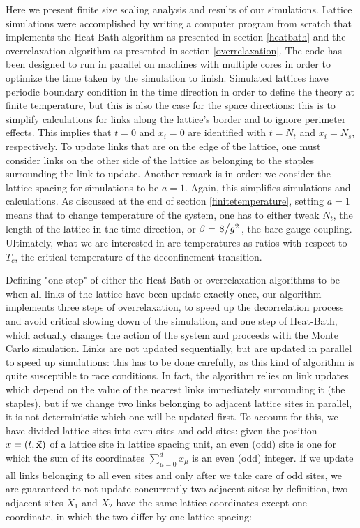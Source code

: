 \documentclass[reqno,12pt]{article}
\numberwithin{equation}{section}
\begin{document}
Here we present finite size scaling analysis and results of our simulations. Lattice simulations were accomplished
by writing a computer program from scratch that implements the Heat-Bath algorithm as presented in section
\ref{heatbath} and the overrelaxation algorithm as presented in section \ref{overrelaxation}. 
The code has been designed to run in parallel on machines with multiple cores in order to
optimize the time taken by the simulation to finish. Simulated lattices have periodic boundary condition in the time
direction in order to define the theory at finite temperature, but this is also the case for the space directions:
this is to simplify calculations for links along the lattice's border and to ignore perimeter effects. This implies
that $t = 0$ and $x_i = 0$ are identified with $t = N_t$ and $x_i = N_s$, respectively.
To update links that are on the edge of the lattice, one must consider links on the other side of the lattice as 
belonging to the staples surrounding the link to update. Another remark is in order: we consider the lattice spacing
for simulations to be $a = 1$. Again, this simplifies simulations and calculations. As discussed at the end of
section \ref{finitetemperature}, setting $a = 1$ means that to change temperature of the system, one has to either
tweak $N_t$, the length of the lattice in the time direction, or $\beta = \flatfrac{8}{g^2}$, the bare gauge
coupling. Ultimately, what we are interested in are temperatures as ratios with respect to $T_c$, the critical 
temperature of the deconfinement transition.

Defining "one step" of either the Heat-Bath or overrelaxation algorithms to be when all links of the lattice
have been update exactly once, our algorithm implements three steps of overrelaxation, to speed up the
decorrelation process and avoid critical slowing down of the simulation, and one step of Heat-Bath, which 
actually changes the action of the system and proceeds with the Monte Carlo simulation. Links are not updated
sequentially, but are updated in parallel to speed up simulations: this has to be done carefully, as this kind
of algorithm is quite susceptible to race conditions. In fact, the algorithm relies on link updates which
depend on the value of the nearest links immediately surrounding it (the staples), but if we change two links
belonging to adjacent lattice sites in parallel, it is not deterministic which one will be updated first. To 
account for this, we have divided lattice sites into even sites and odd sites: given the position 
$x = (t, \va{x})$ of a lattice site in lattice spacing unit, an even (odd) site is one for which the sum of its coordinates
$\sum_{\mu = 0}^d x_\mu$ is an even (odd) integer. If we update all links belonging to all even sites and only
after we take care of odd sites, we are guaranteed to not update concurrently two adjacent sites: by definition,
two adjacent sites $X_1$ and $X_2$ have the same lattice coordinates except one coordinate, in which
the two differ by one lattice spacing:
\end{document}
